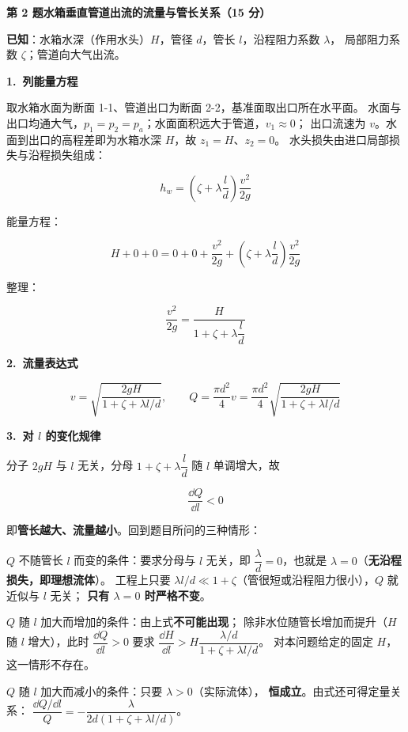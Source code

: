 \noindent\textbf{第 2 题\quad 水箱垂直管道出流的流量与管长关系（15 分）}

\begin{jie}
\textbf{已知}：水箱水深（作用水头）$H$，管径 $d$，管长 $l$，沿程阻力系数 $\lambda$，
局部阻力系数 $\zeta$；管道向大气出流。

\textbf{1.\ 列能量方程}

取水箱水面为断面 1-1、管道出口为断面 2-2，基准面取出口所在水平面。
水面与出口均通大气，$p_1=p_2=p_a$；水面面积远大于管道，$v_1\approx0$；
出口流速为 $v$。水面到出口的高程差即为水箱水深 $H$，故 $z_1=H$、$z_2=0$。
水头损失由进口局部损失与沿程损失组成：

\[ h_w=\left(\zeta+\lambda\frac{l}{d}\right)\frac{v^2}{2g} \]

能量方程：

\[ H+0+0=0+0+\frac{v^2}{2g}+\left(\zeta+\lambda\frac{l}{d}\right)\frac{v^2}{2g} \]

整理：

\[ \frac{v^2}{2g}=\frac{H}{1+\zeta+\lambda\dfrac{l}{d}} \]

\textbf{2.\ 流量表达式}

\[ v=\sqrt{\frac{2gH}{1+\zeta+\lambda l/d}},\qquad
Q=\frac{\pi d^2}{4}v=\frac{\pi d^2}{4}\sqrt{\frac{2gH}{1+\zeta+\lambda l/d}} \]

\textbf{3.\ 对 $l$ 的变化规律}

分子 $2gH$ 与 $l$ 无关，分母 $1+\zeta+\lambda\dfrac{l}{d}$ 随 $l$ 单调增大，故

\[ \frac{\dd Q}{\dd l}<0 \]

即\textbf{管长越大、流量越小}。回到题目所问的三种情形：

\begin{xiaowen}
\item $Q$ 不随管长 $l$ 而变的条件：要求分母与 $l$ 无关，即
$\dfrac{\lambda}{d}=0$，也就是 $\lambda=0$（\textbf{无沿程损失，即理想流体}）。
工程上只要 $\lambda l/d\ll1+\zeta$（管很短或沿程阻力很小），$Q$ 就近似与 $l$ 无关；
\textbf{只有 $\lambda=0$ 时严格不变}。
\item $Q$ 随 $l$ 加大而增加的条件：由上式\textbf{不可能出现}；
除非水位随管长增加而提升（$H$ 随 $l$ 增大），此时
$\dfrac{\dd Q}{\dd l}>0$ 要求 $\dfrac{\dd H}{\dd l}>H\dfrac{\lambda/d}{1+\zeta+\lambda l/d}$。
对本问题给定的固定 $H$，这一情形不存在。
\item $Q$ 随 $l$ 加大而减小的条件：只要 $\lambda>0$（实际流体），
\textbf{恒成立}。由式还可得定量关系：
$\dfrac{\dd Q/\dd l}{Q}=-\dfrac{\lambda}{2d\left(1+\zeta+\lambda l/d\right)}$。
\end{xiaowen}


\end{jie}
